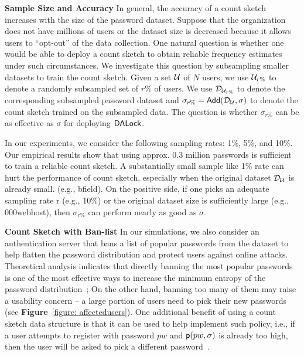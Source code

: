 \textbf{Sample Size and Accuracy} In general, the accuracy of a count sketch increases with the size of the password dataset. Suppose that the organization does not have millions of users or the dataset size is decreased because it allows users to ``opt-out” of the data collection. One natural question is whether one would be able to deploy a count sketch to obtain reliable frequency estimates under such circumstances. We investigate this question by subsampling smaller datasets to train the count sketch. Given a set $\mathcal{U}$ of $N$ users, we use $\mathcal{U}_{r\%}$ to denote a randomly subsampled set of $r\%$ of users. We use $\mathcal{D}_{{\mathcal{U}_{r\%}}}$ to denote the corresponding subsampled password dataset and $\sigma_{r\%} = \mathsf{Add}(\mathcal{D}_{{\mathcal{U}}},\sigma) $ to denote the count sketch trained on the subsampled data. The question is whether $\sigma_{r\%}$ can be as effective as $\sigma$ for deploying $\mathsf{DALock}$. 




In our experiments, we consider the following sampling rates: 1\%, 5\%, and 10\%. Our empirical results show that using approx. 0.3 million passwords is sufficient to train a reliable count sketch. A substantially small sample like 1\% rate can hurt the performance of count sketch, especially when the original dataset $\mathcal{D}_{{\mathcal{U}}}$ is already small. (e.g., bfield). On the positive side, if one picks an adequate sampling rate r (e.g., 10\%) or the original dataset size is sufficiently large (e.g., 000webhost), then $\sigma_{r\%}$ can perform nearly as good as $\sigma$.





\textbf{Count Sketch with Ban-list} In our simulations, we also consider an authentication server that bans a list of popular passwords from the dataset to help flatten the password distribution and protect users against online attacks. Theoretical analysis indicates that directly banning the most popular passwords is one of the most effective ways to increase the minimum entropy of the password distribution~\cite{BKPS:ACMEC13}; On the other hand, banning too many of them may raise a usability concern – a large portion of users need to pick their new passwords (see \textbf{Figure}~\ref{figure: affectedusers}). One additional benefit of using a count sketch data structure is that it can be used to help implement such policy, i.e., if a user attempts to register with password $pw$ and $\textsf{p}(pw,\sigma)$ is already too high, then the user will be asked to pick a different password~\cite{HTS:SchHerMit10}.




